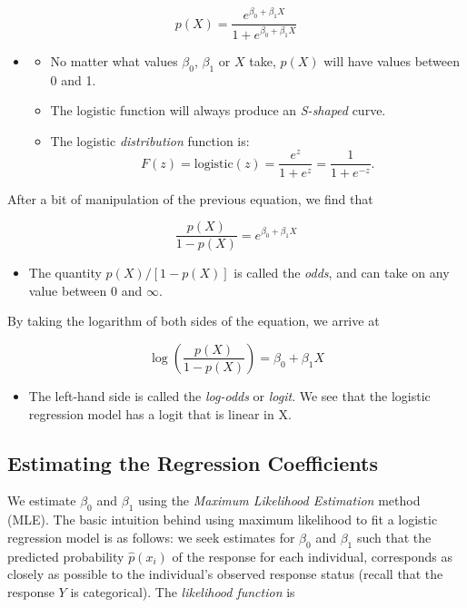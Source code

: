 \documentclass[]{book}
\providecommand{\tightlist}{%
  \setlength{\itemsep}{0pt}\setlength{\parskip}{0pt}}
\newenvironment{rmdblock}[1]
  {\begin{shaded*}
  \begin{itemize}
  \renewcommand{\labelitemi}{
    \raisebox{-.7\height}[0pt][0pt]{
      {\setkeys{Gin}{width=2em,keepaspectratio}\texttt{[image: img/icons/\#1]}}
    }
  }
  \item
  }
  {
  \end{itemize}
  \end{shaded*}
  }
\newenvironment{rmdinsight}
  {\begin{rmdblock}{insight}}
  {\end{rmdblock}}
\begin{document}
\[ p(X) = \frac{e^{\beta_0 + \beta_1 X}}{1+e^{\beta_0 + \beta_1 X}} \]

\begin{rmdinsight}
\begin{itemize}
\tightlist
\item
  No matter what values \(\beta_0\), \(\beta_1\) or \(X\) take, \(p(X)\)
  will have values between 0 and 1.
\item
  The logistic function will always produce an \emph{S-shaped} curve.
\item
  The logistic \emph{distribution} function is:
  \[F(z)=\mathrm{logistic}(z)=\frac{e^z}{1+e^z}=\frac{1}{1+e^{-z}}.\]
\end{itemize}
\end{rmdinsight}

After a bit of manipulation of the previous equation, we find that

\[ \frac{p(X)}{1-p(X)} = e^{\beta_0 + \beta_1 X} \]

\begin{rmdinsight}
The quantity \(p(X)/[1−p(X)]\) is called the \emph{odds}, and can take
on any value between \(0\) and \(\infty\).
\end{rmdinsight}

By taking the logarithm of both sides of the equation, we arrive at

\[ \log( \frac{p(X)}{1-p(X)} ) = \beta_0 + \beta_1 X \]

\begin{rmdinsight}
The left-hand side is called the \emph{log-odds} or \emph{logit}. We see
that the logistic regression model has a logit that is linear in X.
\end{rmdinsight}

\subsection{Estimating the Regression
Coefficients}\label{estimating-the-regression-coefficients-1}

We estimate \(\beta_0\) and \(\beta_1\) using the \emph{Maximum
Likelihood Estimation} method (MLE). The basic intuition behind using
maximum likelihood to fit a logistic regression model is as follows: we
seek estimates for \(\beta_0\) and \(\beta_1\) such that the predicted
probability \(\hat{p}(x_i)\) of the response for each individual,
corresponds as closely as possible to the individual's observed response
status (recall that the response \(Y\) is categorical). The
\emph{likelihood function} is
\end{document}
